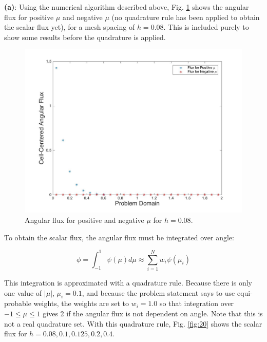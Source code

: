 \documentclass[10pt]{article}
\begin{document}
\textbf{(a)}: Using the numerical algorithm described above, Fig. \ref{fig:1} shows the angular flux for positive \(\mu\) and negative \(\mu\) (no quadrature rule has been applied to obtain the scalar flux yet), for a mesh spacing of \(h=0.08\). This is included purely to show some results before the quadrature is applied. 

\begin{figure}[H]
  \centering
  \includegraphics[width=12cm]{AngularFluxh08.jpg} %
  \caption{Angular flux for positive and negative \(\mu\) for \(h=0.08\).}
  \label{fig:1}
\end{figure}

To obtain the scalar flux, the angular flux must be integrated over angle:

\begin{equation}
\phi=\int_{-1}^{1}\psi(\mu)d\mu\approx\sum_{i=1}^{N}w_i\psi(\mu_i)
\end{equation}

This integration is approximated with a quadrature rule. Because there is only one value of \(|\mu|\), \(\mu_i=0.1\), and because the problem statement says to use equi-probable weights, the weights are set to \(w_i=1.0\) so that integration over \(-1\leq\mu\leq1\) gives 2 if the angular flux is not dependent on angle. Note that this is not a real quadrature set. With this quadrature rule, Fig. \ref{fig:20} shows the scalar flux for \(h=0.08, 0.1, 0.125, 0.2, 0.4\). 
\end{document}
